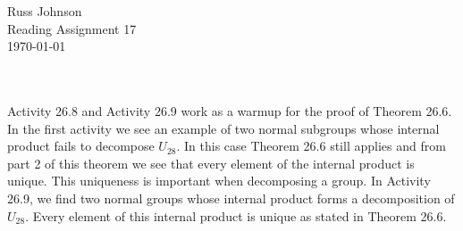 \documentclass[11pt,a4paper]{article}
\begin{document}
\begin{flushright}
Russ Johnson\\
Reading Assignment 17\\
\today\\
\end{flushright}
~\\
~\\
Activity 26.8 and Activity 26.9 work as a warmup for the proof of Theorem 26.6. In the first activity we see an example of two normal subgroups whose internal product fails to decompose $U_{28}$. In this case Theorem 26.6 still applies and from part 2 of this theorem we see that every element of the internal product is unique. This uniqueness  is important when decomposing a group. In Activity 26.9, we find two normal groups whose internal product forms a decomposition of $U_{28}$. Every element of this internal product is unique as stated in Theorem 26.6.
\end{document}
